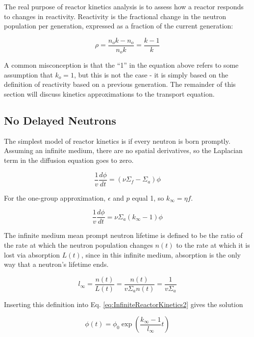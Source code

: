 \documentclass[10pt]{article}
\newcommand{\beq}{\begin{equation}}
\newcommand{\eeq}{\end{equation}}
\begin{document}
\begin{flushleft}

The real purpose of reactor kinetics analysis is to assess how a reactor responds to changes in reactivity. Reactivity is the fractional change in the neutron population per generation, expressed as a fraction of the current generation:

\beq
\label{eq:Reactivity}
\rho=\frac{n_ok-n_o}{n_ok}=\frac{k-1}{k}
\eeq

A common misconception is that the ``1'' in the equation above refers to some assumption that \(k_o=1\), but this is not the case - it is simply based on the definition of reactivity based on a previous generation. The remainder of this section will discuss kinetics approximations to the transport equation.

\subsection{No Delayed Neutrons}
The simplest model of reactor kinetics is if every neutron is born promptly. Assuming an infinite medium, there are no spatial derivatives, so the Laplacian term in the diffusion equation goes to zero.

\beq
\label{eq:InfiniteReactorKinetics1}
\frac{1}{v}\frac{d\phi}{dt}=(\nu\Sigma_f-\Sigma_a)\phi
\eeq

For the one-group approximation, \(\epsilon\) and \(p\) equal 1, so \(k_\infty=\eta f\).

\beq
\label{eq:InfiniteReactorKinetics2}
\frac{1}{v}\frac{d\phi}{dt}=\nu\Sigma_a(k_\infty-1)\phi
\eeq

The infinite medium mean prompt neutron lifetime is defined to be the ratio of the rate at which the neutron population changes \(n(t)\) to the rate at which it is lost via absorption \(L(t)\), since in this infinite medium, absorption is the only way that a neutron's lifetime ends. 

\beq
\label{eq:InfinitePromptLifetime}
l_\infty=\frac{n(t)}{L(t)}=\frac{n(t)}{v\Sigma_an(t)}=\frac{1}{v\Sigma_a}
\eeq

Inserting this definition into Eq. \ref{eq:InfiniteReactorKinetics2} gives the solution

\beq
\label{eq:InfiniteReactorKineticsSolution}
\phi(t)=\phi_0\exp\left(\frac{k_\infty-1}{l_\infty}t\right)
\eeq


\end{flushleft}
\end{document}
